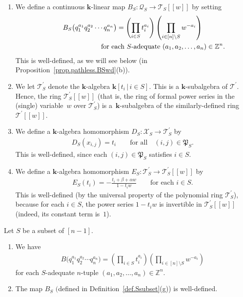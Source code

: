 \begin{Definition}
\begin{enumerate}
\item[(g)] We define a continuous $\mathbf{k}$-linear map $B_{S}\colon \mathcal{Q}_{S}\rightarrow\mathcal{T}_{S}[[w]] $ by setting
\begin{gather*}
B_{S}\big( q_{1}^{a_{1}}q_{2}^{a_{2}}\cdots q_{n}^{a_{n}}\big) =\left( \prod_{i\in S}t_{i}^{a_{i}}\right) \left( \prod_{i\in[n] \setminus S}w^{-a_{i}}\right) \\
\hphantom{B_{S}\big( q_{1}^{a_{1}}q_{2}^{a_{2}}\cdots q_{n}^{a_{n}}\big) =}{} \text{for each }S\text{-adequate } ( a_{1},a_{2},\ldots,a_{n}) \in\mathbb{Z}^{n}.
\end{gather*}
This is well-defined, as we will see below (in Proposition~\ref{prop.pathless.BSwd}(b)).
\item[(h)] We let $\mathcal{T}_{S}^{\prime}$ denote the $\mathbf{k}$-algebra $\mathbf{k} [ t_{i}\,|\, i\in S ] $. This is a $\mathbf{k}$-subalgebra of $\mathcal{T}^{\prime}$. Hence, the ring $\mathcal{T}_{S}^{\prime}[[w]] $ (that is, the ring of formal power series in the (single) variable~$w$ over $\mathcal{T}_{S}^{\prime}$) is a~$\mathbf{k}$-subalgebra of the similarly-defined ring~$\mathcal{T}^{\prime}[[w]] $.
\item[(i)] We define a $\mathbf{k}$-algebra homomorphism $D_{S}\colon \mathcal{X}_{S}\rightarrow\mathcal{T}_{S}^{\prime}$ by
\begin{gather*}
D_{S}(x_{i,j}) =t_{i}\qquad \text{for all} \quad (i,j) \in\mathfrak{P}_{S}.
\end{gather*}
This is well-defined, since each $(i,j) \in\mathfrak{P}_{S}$ satisfies $i\in S$.
\item[(j)] We define a $\mathbf{k}$-algebra homomorphism $E_{S}\colon \mathcal{T}_{S}^{\prime}\rightarrow\mathcal{T}_{S}^{\prime} [ [w]] $ by
\begin{gather*}
E_{S}(t_{i}) =-\frac{t_{i}+\beta+\alpha w}{1-t_{i}w}\qquad \text{for each }i\in S.
\end{gather*}
This is well-defined (by the universal property of the polynomial ring $\mathcal{T}_{S}^{\prime}$), because for each $i\in S$, the power series $1-t_{i}w$ is invertible in $\mathcal{T}_{S}^{\prime} [ [w]] $ (indeed, its constant term is~$1$).
\end{enumerate}
\end{Definition}

\begin{Proposition}\label{prop.pathless.BSwd}Let $S$ be a subset of $[n-1] $.
\begin{enumerate}\itemsep=0pt
\item[{\rm (a)}] We have
\begin{gather}
B\big( q_{1}^{a_{1}}q_{2}^{a_{2}}\cdots q_{n}^{a_{n}}\big) =\left(\prod_{i\in S}t_{i}^{a_{i}}\right) \left( \prod_{i\in[n]\setminus S}w^{-a_{i}}\right) \label{eq.prop.pathless.BSwd.a.eq}
\end{gather}
for each $S$-adequate $n$-tuple $ ( a_{1},a_{2},\ldots,a_{n} ) \in\mathbb{Z}^{n}$.

\item[{\rm (b)}] The map $B_{S}$ $($defined in Definition~{\rm \ref{def.Ssubset}(g))} is well-defined.
\end{enumerate}
\end{Proposition}


